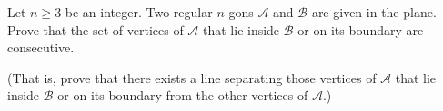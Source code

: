 Let $n \geq 3$ be an integer. Two regular $n$-gons $\mathcal{A}$ and $\mathcal{B}$ are given in the plane. Prove that the set of vertices of $\mathcal{A}$ that lie inside $\mathcal{B}$ or on its boundary are consecutive.

(That is, prove that there exists a line separating those vertices of $\mathcal{A}$ that lie inside $\mathcal{B}$ or on its boundary from the other vertices of $\mathcal{A}$.)
